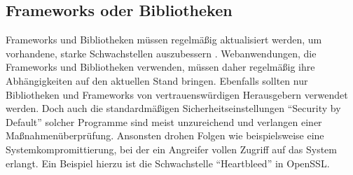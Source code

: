 \subsection{Frameworks oder Bibliotheken}
Frameworks und Bibliotheken müssen regelmäßig aktualisiert werden, um vorhandene, starke Schwachstellen auszubessern  \cite[S.~21]{websecurity-book}.
Webanwendungen, die Frameworks und Bibliotheken verwenden, müssen daher regelmäßig ihre Abhängigkeiten auf den aktuellen Stand bringen. Ebenfalls sollten nur Bibliotheken und Frameworks von vertrauenswürdigen Herausgebern verwendet werden. Doch auch die standardmäßigen Sicherheitseinstellungen \enquote{Security by Default} solcher Programme sind meist unzureichend und verlangen einer Maßnahmenüberprüfung.
Ansonsten drohen Folgen wie beispielsweise eine Systemkompromittierung, bei der ein Angreifer vollen Zugriff auf das System erlangt.
Ein Beispiel hierzu ist die Schwachstelle \enquote{Heartbleed} in OpenSSL.
